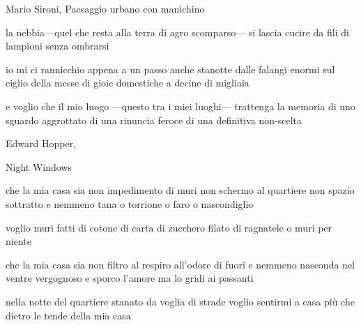 \clearpage


\begin{artItem}
	Mario Sironi, Paesaggio urbano con manichino
\end{artItem}

\begin{poem}
	\begin{stanza}
		la nebbia—quel che resta\verseline
		alla terra di agro scomparso—\verseline
		si lascia cucire da fili\verseline
		di lampioni senza ombrarsi
	\end{stanza}

	\begin{stanza}
		io mi ci rannicchio appena\verseline
		a un passo anche stanotte\verseline
		dalle falangi enormi\verseline
		sul ciglio della messe\verseline
		di gioie domestiche\verseline
		a decine di migliaia
	\end{stanza}

	\begin{stanza}
		e voglio che il mio luogo\verseline
		—questo tra i miei luoghi—\verseline
		trattenga la memoria\verseline
		di uno sguardo aggrottato\verseline
		di una rinuncia feroce\verseline
		di una definitiva non-scelta
	\end{stanza}
\end{poem}

\clearpage


\begin{artItem}
	Edward Hopper, \begin{otherlanguage}{english}%
		Night Windows%
	\end{otherlanguage}
\end{artItem}

\begin{poem}
	\begin{stanza}
		che la mia casa sia\verseline
		non impedimento di muri\verseline
		non schermo al quartiere\verseline
		non spazio sottratto\verseline
		e nemmeno\verseline
		tana\verseline
		o torrione\verseline
		o faro\verseline
		o nascondiglio
	\end{stanza}

	\begin{stanza}
		voglio muri fatti di cotone\verseline
		di carta\verseline
		di zucchero filato\verseline
		di ragnatele\verseline
		o muri per niente
	\end{stanza}

	\begin{stanza}
		che la mia casa sia\verseline
		non filtro al respiro\verseline
		all'odore di fuori\verseline
		e nemmeno\verseline
		nasconda nel ventre\verseline
		vergognoso e sporco\verseline
		l'amore\verseline
		ma lo gridi ai passanti
	\end{stanza}

	\begin{stanza}
		nella notte del quartiere\verseline
		stanato da voglia di strade\verseline
		voglio sentirmi a casa\verseline
		più che dietro le tende\verseline
		della mia casa
	\end{stanza}
\end{poem}

